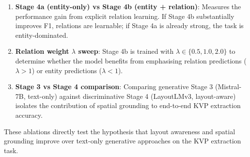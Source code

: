 \begin{enumerate}
    \item \textbf{Stage 4a (entity-only) vs Stage 4b (entity + relation)}: Measures the performance gain from explicit relation learning. If Stage 4b substantially improves F1, relations are learnable; if Stage 4a is already strong, the task is entity-dominated.
    
    \item \textbf{Relation weight $\lambda$ sweep}: Stage 4b is trained with $\lambda \in \{0.5, 1.0, 2.0\}$ to determine whether the model benefits from emphasising relation predictions ($\lambda > 1$) or entity predictions ($\lambda < 1$).
    
    \item \textbf{Stage 3 vs Stage 4 comparison}: Comparing generative Stage 3 (Mistral-7B, text-only) against discriminative Stage 4 (LayoutLMv3, layout-aware) isolates the contribution of spatial grounding to end-to-end KVP extraction accuracy.
\end{enumerate}

These ablations directly test the hypothesis that layout awareness and spatial grounding improve over text-only generative approaches on the KVP extraction task.


